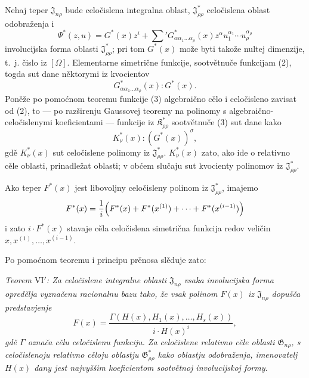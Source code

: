 \documentclass[11pt]{article}
\providecommand{\Kfield}{\mathfrak{K}}
\providecommand{\Jdom}{\mathfrak{J}}
\providecommand{\Gdom}{\mathfrak{G}}
\begin{document}
Nehaj teper $\Jdom_{n\rho}$ bude celočislena integralna oblast, $\Jdom^*_{\rho\rho}$ celočislena oblast odobraženja i
\[
  \Psi^*(z,u)=G^*(x)z^i+
  \sum{}'G^*_{\alpha\alpha_1\ldots\alpha_\rho}(x)
  z^\alpha u_1^{\alpha_1}\cdots u_\rho^{\alpha_\rho}
\]
involucijska forma oblasti $\Jdom^*_{\rho\rho}$; pri tom $G^*(x)$ može byti takože nultej dimenzije, t.~j. čislo iz $[\Omega]$. Elementarne simetrične funkcije, sootvětnuče funkcijam (2), togda sut dane něktorymi iz kvocientov
\begin{equation}
  G^*_{\alpha\alpha_1\ldots\alpha_\rho}(x):G^*(x).
\tag{4}
\end{equation}
Poněže po pomoćnom teoremu funkcije (3) algebraično cělo i celočisleno zavisat od (2), to --- po razširenju Gaussovej teoremy na polinomy s algebraično-celočislenymi koeficientami --- funkcije iz $\Kfield^*_{\rho\rho}$ sootvětnuče (3) sut dane kako
\begin{equation}
  K_\nu^*(x):(G^*(x))^\sigma,
\tag{5}
\end{equation}
gdě $K_\nu^*(x)$ sut celočislene polinomy iz $\Jdom^*_{\rho\rho}$. $K_\nu^*(x)$ zato, ako ide o relativno cěle oblasti, prinadležat oblasti; v obćem slučaju sut kvocienty polinomov iz $\Jdom^*_{\rho\rho}$.

Ako teper $F^*(x)$ jest libovoljny celočisleny polinom iz $\Jdom^*_{\rho\rho}$, imajemo
\[
  F^*(x)=\frac1i\Bigl(F^*(x)+F^*(x^{(1)})+\cdots+F^*(x^{(i-1)})\Bigr)
\]
i zato $i\cdot F^*(x)$ stavaje cěla celočislena simetrična funkcija redov veličin $x,x^{(1)},\ldots,x^{(i-1)}$.

Po pomoćnom teoremu i principu prěnosa slěduje zato:

{\itshape Teorem $\mathrm{VI}'$: Za celočislene integralne oblasti $\Jdom_{n\rho}$ vsaka involucijska forma opredělja vyznačenu racionalnu bazu tako, že vsak polinom $F(x)$ iz $\Jdom_{n\rho}$ dopušča predstavjenje}
\[
  F(x)=\frac{\Gamma(H(x),H_1(x),\ldots,H_s(x))}{i\cdot H(x)^i},
\]
{\itshape gdě $\Gamma$ označa cělu celočislenu funkciju. Za celočislene relativno cěle oblasti $\Gdom_{n\rho}$, s celočislenoju relativno cěloju oblastju $\Gdom^*_{\rho\rho}$ kako oblastju odobraženja, imenovatelj $H(x)$ dany jest najvyššim koeficientom sootvětnoj involucijskoj formy.}
\end{document}
